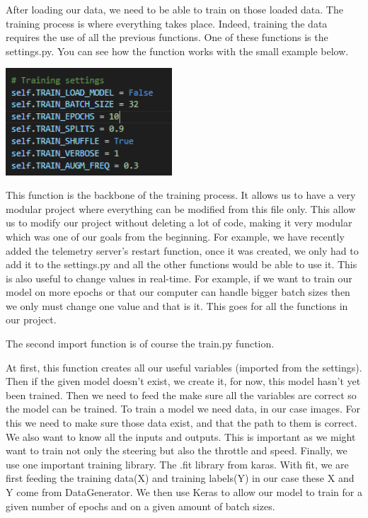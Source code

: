 \documentclass[12pt]{article}
\begin{document}
After loading our data, we need to be able to train on those loaded data. The training process is where everything takes place. Indeed, training the data requires the use of all the previous functions. One of these functions is the settings.py. You can see how the function works with the small example below.

\centerline{\includegraphics[height=4cm]{../../docs/setting-train.png}}

This function is the backbone of the training process. It allows us to have a very modular project where everything can be modified from this file only. This allow us to modify our project without deleting a lot of code, making it very modular which was one of our goals from the beginning. For example, we have recently added the telemetry server's restart function, once it was created, we only had to add it to the settings.py and all the other functions would be able to use it.   
This is also useful to change values in real-time. For example, if we want to train our model on more epochs or that our computer can handle bigger batch sizes then we only must change one value and that is it. This goes for all the functions in our project. 

The second import function is of course the train.py function.

At first, this function creates all our useful variables (imported from the settings).  Then if the given model doesn’t exist, we create it, for now, this model hasn’t yet been trained.  Then we need to feed the make sure all the variables are correct so the model can be trained.  To train a model we need data, in our case images. For this we need to make sure those data exist, and that the path to them is correct.  
We also want to know all the inputs and outputs. This is important as we might want to train not only the steering but also the throttle and speed.  
Finally, we use one important training library. The .fit library from karas. With fit, we are first feeding the training data(X) and training labels(Y) in our case these X and Y come from DataGenerator. We then use Keras to allow our model to train for a given number of epochs and on a given amount of batch sizes. 
\end{document}
